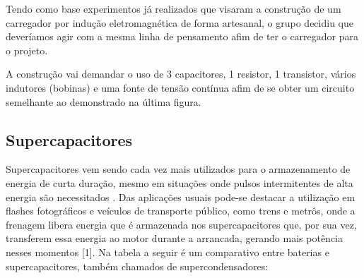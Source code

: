 Tendo como base experimentos já realizados que visaram a construção de um carregador por indução eletromagnética de forma artesanal, o grupo decidiu que deveríamos agir com a mesma linha de pensamento afim de ter o carregador para o projeto.

A construção vai demandar o uso de 3 capacitores, 1 resistor, 1 transistor, vários indutores (bobinas) e uma fonte de tensão contínua afim de se obter um circuito semelhante ao demonstrado na última figura.


\subsection{Supercapacitores}
Supercapacitores vem sendo cada vez mais utilizados para o armazenamento de energia de curta duração, mesmo em situações onde pulsos intermitentes de alta energia são necessitados \cite{supercampos}.
Das aplicações usuais pode-se destacar a utilização em flashes fotográficos e veículos de transporte público, como trens e metrôs, onde a frenagem libera energia que é armazenada nos supercapacitores que, por sua vez, transferem essa energia ao motor durante a arrancada, gerando  mais potência nesses momentos [1].
Na tabela a seguir é um comparativo entre baterias e supercapacitores, também chamados de supercondensadores: 


